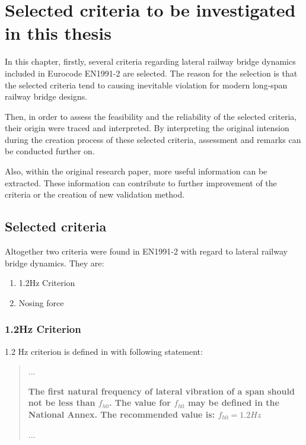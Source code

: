 
\chapter{Selected criteria to be investigated in this thesis}\label{Chap:selectedCriteria}

In this chapter, firstly, several criteria regarding lateral railway bridge dynamics included in Eurocode EN1991-2 are selected. The reason for the selection is that the selected criteria tend to causing inevitable violation for modern long-span railway bridge designs. 

Then, in order to assess the feasibility and the reliability of the selected criteria, their origin were traced and interpreted. By interpreting the original intension during the creation process of these selected criteria, assessment and remarks can be conducted further on.

Also, within the original research paper, more useful information can be extracted. These information can contribute to further improvement of the criteria or the creation of new validation method.

\section{Selected criteria}

Altogether two criteria were found in EN1991-2 with regard to lateral railway bridge dynamics. They are:

\begin{enumerate}
	\item 1.2Hz Criterion
	\item Nosing force
\end{enumerate}

\subsection{1.2Hz Criterion}
1.2 Hz criterion is defined in \citet[A24.4.2.4]{EC12} with following statement:

\begin{quote}
	...

	\textbf{The first natural frequency of lateral vibration of a span should not be less than $f_{h0}$. The value for $f_{h0}$ may be defined in the National Annex. The recommended value is: $f_{h0}=1.2 Hz$}

	...

\end{quote}

